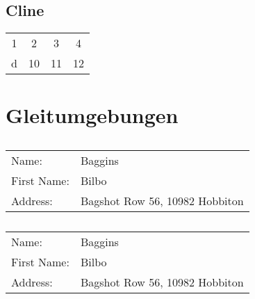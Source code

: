 \documentclass[10pt, a4paper]{article}
\renewcommand{\arraystretch}{1.1} %
\begin{document}
\subsection{Cline}

\begin{tabular}{|c|c|c|c|}
\hline
1 & 2 & 3 & 4\\
\cline{2-4} d & 10 & 11 & 12\\
\hline
\end{tabular}

\section{Gleitumgebungen}



\begin{table}[h]
\caption{\blindtext}
\centering
\begin{tabular}{ll}
\hline
Name: & Baggins \\
First Name: & Bilbo\\
Address: & Bagshot Row 56, 10982 Hobbiton\\
\hline
\end{tabular}
\end{table}

\begin{table}[h]
\centering\renewcommand\arraystretch{1.1}
\begin{threeparttable}
\caption{\blindtext}
\begin{tabular}{ll}
\toprule
Name: & Baggins \\
First Name: & Bilbo \\
Address: & Bagshot Row 56, 10982 Hobbiton \\
\bottomrule
\end{tabular}
\end{threeparttable}
\end{table}
\end{document}
